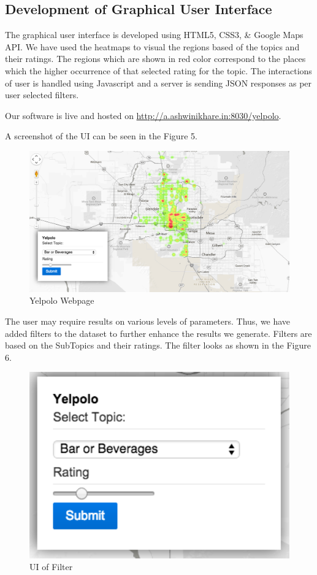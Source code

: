 \documentclass[12pt]{article} %
\begin{document}
\subsection{Development of Graphical User Interface}

The graphical user interface is developed using HTML5, CSS3, \& Google Maps API. We have used the heatmaps to visual the regions based of the topics and their ratings. The regions which are shown in red color correspond to the places which the higher occurrence of that selected rating for the topic. The interactions of user is handled using Javascript and a server is sending JSON responses as per user selected filters. 

Our software is live and hosted on \href{http://a.ashwinikhare.in:8030/yelpolo}{http://a.ashwinikhare.in:8030/yelpolo}. 

A screenshot of the UI can be seen in the Figure 5. 

\begin{figure}[h]
\begin{center}
\includegraphics[width=4.8in]{screen.png}
\caption{Yelpolo Webpage}
\end{center}
\end{figure}

The user may require results on various levels of parameters. Thus, we have added filters to the dataset to further enhance the results we generate. Filters are based on the SubTopics and their ratings. The filter looks as shown in the Figure 6.

\begin{figure}[h]
\begin{center}
\includegraphics[width=4.8in]{filter.png}
\caption{UI of Filter}
\end{center}
\end{figure}
\end{document}
